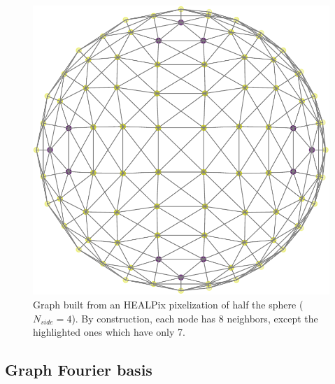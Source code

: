 \documentclass[final,twocolumn,3p,times,authoryear]{elsarticle}
\newcommand{\1}{\b{1}}              %
\newcommand{\0}{\b{0}}              %
\begin{document}

\begin{figure}
	\centering
	\includegraphics[width=0.8\linewidth]{figures/half_graph_4.pdf}
	\caption[]{Graph built from an HEALPix pixelization of half the sphere ($N_{side} = 4$). By construction, each node has 8 neighbors, except the highlighted ones which have only 7.\footnotemark[6]}
	\label{fig:healpix_graph_4}
\end{figure}

\subsection{Graph Fourier basis}
\end{document}
